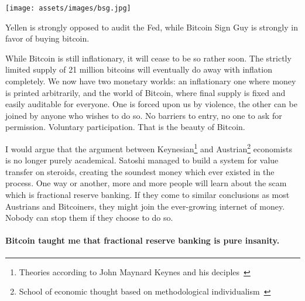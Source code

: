 \begin{center}
  \centering
  \texttt{[image: assets/images/bsg.jpg]}
  \caption{Yellen is strongly opposed to audit the Fed, while Bitcoin Sign Guy is strongly in favor of buying bitcoin.}
  \label{fig:bsg}
\end{center}

While Bitcoin is still inflationary, it will cease to be so rather soon.
The strictly limited supply of 21 million bitcoins will eventually do
away with inflation completely. We now have two monetary worlds: an
inflationary one where money is printed arbitrarily, and the world of
Bitcoin, where final supply is fixed and easily auditable for everyone.
One is forced upon us by violence, the other can be joined by anyone who
wishes to do so. No barriers to entry, no one to ask for permission.
Voluntary participation. That is the beauty of Bitcoin.

I would argue that the argument between Keynesian\footnote{Theories according to
John Maynard Keynes and his deciples~\cite{wiki:keynesian}} and
Austrian\footnote{School of economic thought based on methodological
individualism~\cite{wiki:austrian}} economists is no longer purely academical.
Satoshi managed to build a system for value transfer on steroids, creating the
soundest money which ever existed in the process. One way or another, more and
more people will learn about the scam which is fractional reserve banking. If
they come to similar conclusions as most Austrians and Bitcoiners, they might
join the ever-growing internet of money. Nobody can stop them if they choose to
do so.

\paragraph{Bitcoin taught me that fractional reserve banking is pure insanity.}

%
%
%
%
%
